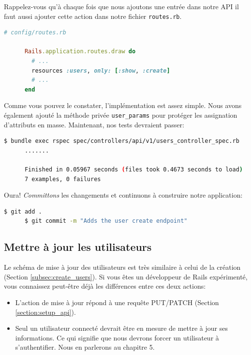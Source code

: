 \documentclass[]{report}
\begin{document}
      Rappelez-vous qu'à chaque fois que nous ajoutons une entrée dans notre API il faut aussi ajouter cette action dans notre fichier \verb|routes.rb|.

      \begin{scriptsize}
      \begin{lstlisting}[language=ruby]
      # config/routes.rb

      Rails.application.routes.draw do
        # ...
        resources :users, only: [:show, :create]
        # ...
      end
      \end{lstlisting}
      \end{scriptsize}

      Comme vous pouvez le constater, l'implémentation est assez simple. Nous avons également ajouté la méthode privée \verb|user_params| pour protéger les assignation d'attributs en masse. Maintenant, nos tests devraient passer:

      \begin{scriptsize}
      \begin{lstlisting}[language=bash]
      $ bundle exec rspec spec/controllers/api/v1/users_controller_spec.rb
      .......

      Finished in 0.05967 seconds (files took 0.4673 seconds to load)
      7 examples, 0 failures
      \end{lstlisting}
      \end{scriptsize}

      Oura! \textit{Committons} les changements et continuons à construire notre application:

      \begin{scriptsize}
      \begin{lstlisting}[language=bash]
      $ git add .
      $ git commit -m "Adds the user create endpoint"
      \end{lstlisting}
      \end{scriptsize}


    \subsection{Mettre à jour les utilisateurs}

      Le schéma de mise à jour des utilisateurs est très similaire à celui de la création (Section \ref{subsec:create_users}). Si vous êtes un développeur de Rails expérimenté, vous connaissez peut-être déjà les différences entre ces deux actions:

      \begin{itemize}
        \item L'action de mise à jour répond à une requête PUT/PATCH (Section \ref{section:setup_api}).
        \item Seul un utilisateur connecté devrait être en mesure de mettre à jour ses informations. Ce qui signifie que nous devrons forcer un utilisateur à s'authentifier. Nous en parlerons au chapitre 5.
      \end{itemize}
\end{document}
